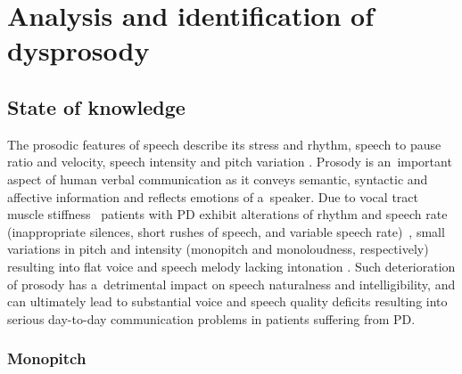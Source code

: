 \chapter[Analysis and identification of dysprosody]{Analysis and identification of dysprosody}
\label{ch4}

\section{State of knowledge}
\label{ch4_1}

The prosodic features of speech describe its stress and rhythm, speech to pause ratio and velocity, speech intensity and pitch variation \cite{Darley1975, Ackermann1997}. Prosody is an~important aspect of human verbal communication as it conveys semantic, syntactic and affective information and reflects emotions of a~speaker. Due to vocal tract muscle stiffness~\cite{Skodda2009} patients with PD exhibit alterations of rhythm and speech rate (inappropriate silences, short rushes of speech, and variable speech rate)~\cite{Brin2009}, small variations in pitch and intensity (monopitch and monoloudness, respectively)~\cite{Hart1990, Duffy2013} resulting into flat voice and speech melody lacking intonation \cite{Canter1963, Darley1975}. Such deterioration of prosody has a~detrimental impact on speech naturalness and intelligibility, and can ultimately lead to substantial voice and speech quality deficits resulting into serious day-to-day communication problems in patients suffering from PD.

\subsection{Monopitch}
\label{ch4_1_1}


